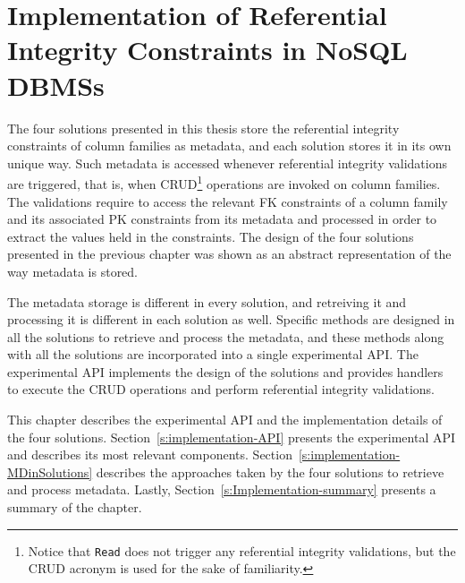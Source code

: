 \chapter{Implementation of Referential Integrity Constraints in NoSQL DBMSs}
\label{c:Implementation}

The four solutions presented in this thesis store  the referential integrity
constraints of column families as metadata, and each solution stores it in its
own unique way. Such metadata is accessed whenever referential integrity
validations are triggered, that is, when \ac{CRUD}\footnote{Notice that
\texttt{Read} does not trigger any referential integrity validations, but the
\ac{CRUD} acronym is used for the sake of familiarity.} operations are invoked
on column families. The validations require to access the relevant  \ac{FK}
constraints of a column family and its associated \ac{PK} constraints from its
metadata and processed in order to extract the values held in the constraints.
The design of the four solutions presented in the previous chapter was shown as
an  abstract representation of the way metadata is stored.

The metadata storage is different in every solution, and retreiving it and
processing it is different in each solution as well. Specific methods are
designed in all the solutions to retrieve and process the metadata, and these
methods along with all the solutions are incorporated into a single experimental
\ac{API}. The experimental \ac{API} implements the design of the solutions and
provides handlers to execute the \ac{CRUD} operations and perform referential
integrity validations.

This chapter describes  the experimental \ac{API} and
the implementation details of the  four solutions.
Section~\ref{s:implementation-API} presents the experimental \ac{API} and
describes its most relevant components.
Section~\ref{s:implementation-MDinSolutions} describes the approaches taken by
the four solutions to retrieve and process metadata.
Lastly, Section~\ref{s:Implementation-summary} presents a summary of the
chapter.
 

